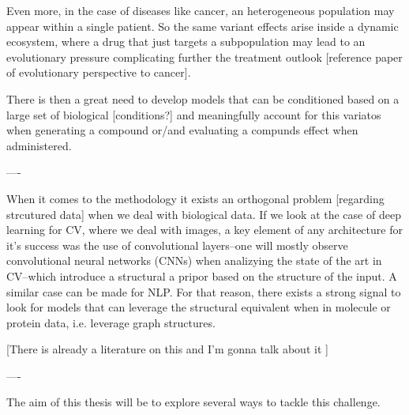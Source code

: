 \documentclass{article}
\begin{document}
Even more, in the case of diseases like cancer, an heterogeneous population may appear
within a single patient. So the same variant effects arise inside a dynamic ecosystem,
where a drug that just targets a subpopulation may lead to an evolutionary pressure
complicating further the treatment outlook [reference paper of evolutionary perspective
to cancer].

There is then a great need to develop models that can be conditioned based on a large
set of biological [conditions?] and meaningfully account for this variatos when
generating a compound or/and evaluating a compunds effect when administered.

----

When it comes to the methodology it exists an orthogonal problem [regarding strcutured
data] when we deal with biological data. If we look at the case of deep learning for CV,
where we deal with images, a key element of any architecture for it's success was the
use of convolutional layers--one will mostly observe convolutional neural networks
(CNNs) when analizying the state of the art in CV--which introduce a structural a pripor
based on the structure of the input. A similar case can be made for NLP. For that
reason, there exists a strong signal to look for models that can leverage the structural
equivalent when in molecule or protein data, i.e. leverage graph structures.

[There is already a literature on this and I'm gonna talk about it \cite{Sun2019}]

----

The aim of this thesis will be to explore several ways to tackle this challenge.


\end{document}
